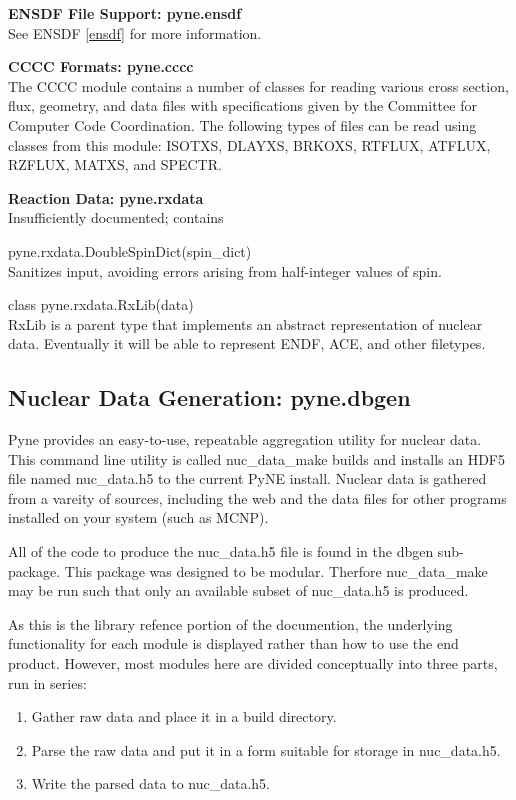 \documentclass{proposalnsf}
\begin{document}
\textbf{ENSDF File Support: pyne.ensdf}\\
See ENSDF \ref{ensdf} for more information.

\textbf{CCCC Formats: pyne.cccc}\\
The CCCC module contains a number of classes for reading various cross section, flux, geometry, and data files with specifications given by the Committee for Computer Code Coordination. The following types of files can be read using classes from this module: ISOTXS, DLAYXS, BRKOXS, RTFLUX, ATFLUX, RZFLUX, MATXS, and SPECTR.

\textbf{Reaction Data: pyne.rxdata}\\
Insufficiently documented; contains 
\begin{compactitem}
\item pyne.rxdata.DoubleSpinDict(spin\_dict)\\
Sanitizes input, avoiding errors arising from half-integer values of spin.
\item class pyne.rxdata.RxLib(data)\\
RxLib is a parent type that implements an abstract representation of nuclear data. Eventually it will be able to represent ENDF, ACE, and other filetypes.
\end{compactitem}

\subsection{Nuclear Data Generation: pyne.dbgen}
Pyne provides an easy-to-use, repeatable aggregation utility for nuclear data. This command line utility is called nuc\_data\_make builds and installs an HDF5 file named nuc\_data.h5 to the current PyNE install. Nuclear data is gathered from a vareity of sources, including the web and the data files for other programs installed on your system (such as MCNP).

All of the code to produce the nuc\_data.h5 file is found in the dbgen sub-package. This package was designed to be modular. Therfore nuc\_data\_make may be run such that only an available subset of nuc\_data.h5 is produced.

As this is the library refence portion of the documention, the underlying functionality for each module is displayed rather than how to use the end product. However, most modules here are divided conceptually into three parts, run in series:

\begin{enumerate}
\item Gather raw data and place it in a build directory.
\item Parse the raw data and put it in a form suitable for storage in nuc\_data.h5.
\item Write the parsed data to nuc\_data.h5.
\end{enumerate}
\end{document}
